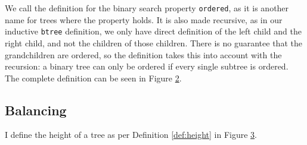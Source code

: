 We call the definition for the binary search property \lstinline{ordered}, as
it is another name for trees where the property holds. It is also made recursive, as in our inductive \lstinline{btree} definition, we only have direct definition of the left child and the right child, 
and not the children of those children. There is no guarantee that the grandchildren are ordered, so the definition takes this into account with the recursion: a binary tree can only be ordered if every single subtree 
is ordered. The complete definition can be seen in Figure \ref{lst:ordered}. 

\begin{figure}[!ht]
  \centering
  
  \caption{}
  \label{lst:forall_keys}
\end{figure}

\begin{figure}[!ht]
  \centering
  
  \caption{}
  \label{lst:ordered}
\end{figure}

\subsection*{Balancing}
I define the height of a tree as per Definition \ref{def:height} in Figure \ref{lst:height}. 

\begin{figure}[!ht]
  \centering
  
  \caption{}
  \label{lst:height}
\end{figure}